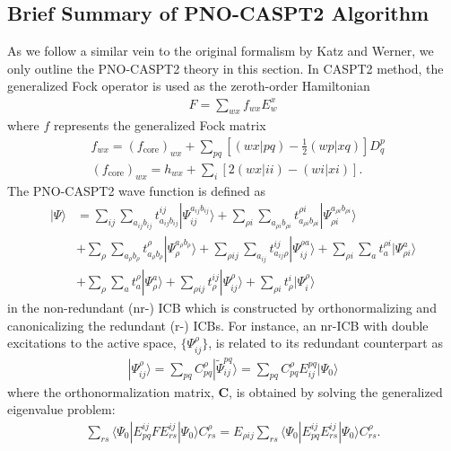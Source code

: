 \documentclass[aip,jcp,amsmath,twocolumn,floatfix,reprint,fleqn]{revtex4-1}
\begin{document}
\subsection{Brief Summary of PNO-CASPT2 Algorithm}

%
As we follow a similar vein to the original formalism by Katz and Werner,\cite{:/content/aip/journal/jcp/145/12/10.1063/1.4963019,doi:10.1063/1.5097644} we only outline the PNO-CASPT2 theory in this section.
%
In CASPT2 method, the generalized Fock operator is used as the zeroth-order Hamiltonian
%
\begin{align}
  F=\sum_{wx} f_{wx} E^x_w
\end{align}
%
where $f$ represents the generalized Fock matrix
%
\begin{align}
  &f_{wx} = (f_\text{core})_{wx} + \sum_{pq} \left[(wx|pq)-\frac{1}{2}(wp|xq)\right]D^p_q \\
  &(f_\text{core})_{wx} = h_{wx} + \sum_{i} [2(wx|ii)-(wi|xi)]. 
\end{align}
%
The PNO-CASPT2 wave function is defined as
%
\begin{align}
  |\Psi\rangle&=\sum_{ij}\sum_{a_{ij}b_{ij}} t_{a_{ij}b_{ij}}^{ij}|\Psi_{ij}^{a_{ij}b_{ij}}\rangle+\sum_{\rho i}\sum_{a_{\rho i}b_{\rho i}} t_{a_{\rho i}b_{\rho i}}^{\rho i}|\Psi_{{\rho i}}^{a_{\rho i}b_{\rho i}}\rangle \nonumber \\
  &+\sum_{\rho}\sum_{a_{\rho}b_{\rho}} t_{a_{\rho}b_{\rho}}^{\rho}|\Psi_{{\rho}}^{a_{\rho}b_{\rho}}\rangle + \sum_{\rho ij}\sum_{a_{ij}} t_{a_{ij}\rho}^{ij}|\Psi_{ij}^{\rho a}\rangle +\sum_{\rho i}\sum_a t_{a}^{\rho i}|\Psi_{\rho i}^{a}\rangle \nonumber \\
  &+\sum_{\rho}\sum_a t_{a}^\rho|\Psi_\rho^a\rangle \nonumber + \sum_{\rho ij} t_{\rho}^{ij}|\Psi_{ij}^\rho\rangle+\sum_{\rho i} t_{\rho}^i|\Psi_{i}^\rho\rangle \label{eq:pno-caspt2}
\end{align}
%
in the non-redundant (nr-) ICB which is constructed by orthonormalizing and canonicalizing the redundant (r-) ICBs.
%
For instance, an nr-ICB with double excitations to the active space, $\{\Psi^{\rho}_{ij}\}$, is related to its redundant counterpart as
%
\begin{align}
  |\Psi_{ij}^{\rho}\rangle=\sum_{pq} C_{pq}^{\rho} |\tilde{\Psi}_{ij}^{pq}\rangle = \sum_{pq} C_{pq}^{\rho} E_{ij}^{pq} |\Psi_0\rangle
\end{align}
%
where the orthonormalization matrix, $\mathbf{C}$, is obtained by solving the generalized eigenvalue problem:
%
\begin{align}
  \sum_{rs}\langle\Psi_0|E_{pq}^{ij}FE_{rs}^{ij}|\Psi_0\rangle C_{rs}^\rho=E_{\rho ij}\sum_{rs}\langle\Psi_0|E_{pq}^{ij}E_{rs}^{ij}|\Psi_0\rangle C_{rs}^\rho. \label{eq:eigen-Vp2}
\end{align}
\end{document}
